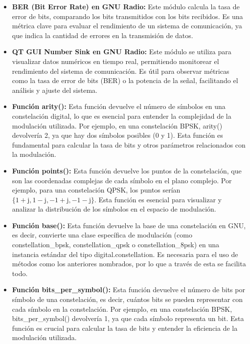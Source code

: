 \documentclass[12pt]{article}
\begin{document}
\begin{itemize}
    \item \textbf{BER (Bit Error Rate) en GNU Radio:} Este módulo calcula la tasa de error de bits, comparando los bits transmitidos con los bits recibidos. Es una métrica clave para evaluar el rendimiento de un sistema de comunicación, ya que indica la cantidad de errores en la transmisión de datos.
    
    \item \textbf{QT GUI Number Sink en GNU Radio:} Este módulo se utiliza para visualizar datos numéricos en tiempo real, permitiendo monitorear el rendimiento del sistema de comunicación. Es útil para observar métricas como la tasa de error de bits (BER) o la potencia de la señal, facilitando el análisis y ajuste del sistema.
    
    \item \textbf{Función arity():} Esta función devuelve el número de símbolos en una constelación digital, lo que es esencial para entender la complejidad de la modulación utilizada. Por ejemplo, en una constelación BPSK, arity() devolvería 2, ya que hay dos símbolos posibles (0 y 1). Esta función es fundamental para calcular la tasa de bits y otros parámetros relacionados con la modulación.
    
    \item \textbf{Función points():} Esta función devuelve los puntos de la constelación, que son las coordenadas complejas de cada símbolo en el plano complejo. Por ejemplo, para una constelación QPSK, los puntos serían $ \{1+\mathrm{j}, 1-\mathrm{j}, -1+\mathrm{j}, -1-\mathrm{j}\} $. Esta función es esencial para visualizar y analizar la distribución de los símbolos en el espacio de modulación.

    \item \textbf{Función base():} Esta función devuelve la base de una constelación en GNU, es decir, convierte una clase específica de modulación (como constellation\_bpsk, constellation\_qpsk o constellation\_8psk) en una instancia estándar del tipo digital.constellation. Es necesaria para el uso de métodos como los anteriores nombrados, por lo que a través de esta se facilita todo.

    \item \textbf{Función bits\_per\_symbol():} Esta función devuelve el número de bits por símbolo de una constelación, es decir, cuántos bits se pueden representar con cada símbolo en la constelación. Por ejemplo, en una constelación BPSK, bits\_per\_symbol() devolvería 1, ya que cada símbolo representa un bit. Esta función es crucial para calcular la tasa de bits y entender la eficiencia de la modulación utilizada.
\end{itemize}
\end{document}
